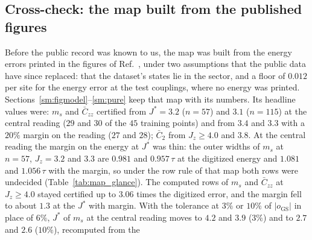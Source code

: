 \documentclass[aps,prx,onecolumn,10pt,nofootinbib,longbibliography,floatfix]{revtex4-2}
\theoremstyle{remark}
\newcommand{\Jz}{J_z}
\newcommand{\ms}{m_s}
\newcommand{\Czz}{\bar C_{zz}}
\newcommand{\Ctwo}{\bar C_{2}}
\newcommand{\GS}{\mathrm{GS}}
\begin{document}
\subsection{Cross-check: the map built from the published figures}
\label{sm:figmap}
Before the public record was known to us, the map was built from the energy errors printed in the figures of
Ref.~\cite{jaderberg2026}, under two assumptions that the public data have since replaced: that the dataset's states
lie in the sector, and a floor of $0.012$ per site for the energy error at the test couplings, where no energy was %
printed. Sections~\ref{sm:figmodel}--\ref{sm:pure} keep that map with its numbers. Its headline values were:
$\ms$ and $\Czz$ certified from $J^*=3.2$ ($n=57$) and $3.1$ ($n=115$) at the central reading ($29$ and $30$ of the $45$ %
training points) and from $3.4$ and $3.3$ with a $20\%$ margin on the reading ($27$ and $28$); $\Ctwo$ from %
$\Jz\ge4.0$ and $3.8$. At the central reading the margin on the energy at $J^*$ was thin: the outer widths of $\ms$ %
at $n=57$, $\Jz=3.2$ and $3.3$ are $0.981$ and $0.957\,\tau$ at the digitized energy and $1.081$ and $1.056\,\tau$ with %
the margin, so under the row rule of that map both rows were undecided (Table~\ref{tab:map_glance}). The computed
rows of $\ms$ and $\Czz$ at $\Jz\ge4.0$ stayed certified up to $3.06$ times the digitized error, and the margin fell %
to about $1.3$ at the $J^*$ with margin. With the tolerance at $3\%$ or $10\%$ of $|o_\GS|$ in place of $6\%$, $J^*$ of %
$\ms$ at the central reading moves to $4.2$ and $3.9$ ($3\%$) and to $2.7$ and $2.6$ ($10\%$), recomputed from the %
\end{document}
